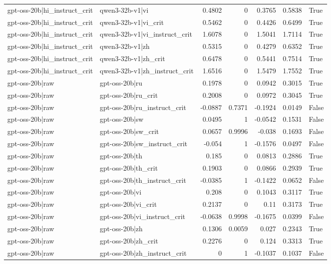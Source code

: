 \begin{table}
\begin{tabular}{l l r r r r l}
gpt-oss-20b|hi_instruct_crit & qwen3-32b-v1|vi & 0.4802 & 0 & 0.3765 & 0.5838 & True \\
gpt-oss-20b|hi_instruct_crit & qwen3-32b-v1|vi_crit & 0.5462 & 0 & 0.4426 & 0.6499 & True \\
gpt-oss-20b|hi_instruct_crit & qwen3-32b-v1|vi_instruct_crit & 1.6078 & 0 & 1.5041 & 1.7114 & True \\
gpt-oss-20b|hi_instruct_crit & qwen3-32b-v1|zh & 0.5315 & 0 & 0.4279 & 0.6352 & True \\
gpt-oss-20b|hi_instruct_crit & qwen3-32b-v1|zh_crit & 0.6478 & 0 & 0.5441 & 0.7514 & True \\
gpt-oss-20b|hi_instruct_crit & qwen3-32b-v1|zh_instruct_crit & 1.6516 & 0 & 1.5479 & 1.7552 & True \\
gpt-oss-20b|raw & gpt-oss-20b|ru & 0.1978 & 0 & 0.0942 & 0.3015 & True \\
gpt-oss-20b|raw & gpt-oss-20b|ru_crit & 0.2008 & 0 & 0.0972 & 0.3045 & True \\
gpt-oss-20b|raw & gpt-oss-20b|ru_instruct_crit & -0.0887 & 0.7371 & -0.1924 & 0.0149 & False \\
gpt-oss-20b|raw & gpt-oss-20b|sw & 0.0495 & 1 & -0.0542 & 0.1531 & False \\
gpt-oss-20b|raw & gpt-oss-20b|sw_crit & 0.0657 & 0.9996 & -0.038 & 0.1693 & False \\
gpt-oss-20b|raw & gpt-oss-20b|sw_instruct_crit & -0.054 & 1 & -0.1576 & 0.0497 & False \\
gpt-oss-20b|raw & gpt-oss-20b|th & 0.185 & 0 & 0.0813 & 0.2886 & True \\
gpt-oss-20b|raw & gpt-oss-20b|th_crit & 0.1903 & 0 & 0.0866 & 0.2939 & True \\
gpt-oss-20b|raw & gpt-oss-20b|th_instruct_crit & -0.0385 & 1 & -0.1422 & 0.0652 & False \\
gpt-oss-20b|raw & gpt-oss-20b|vi & 0.208 & 0 & 0.1043 & 0.3117 & True \\
gpt-oss-20b|raw & gpt-oss-20b|vi_crit & 0.2137 & 0 & 0.11 & 0.3173 & True \\
gpt-oss-20b|raw & gpt-oss-20b|vi_instruct_crit & -0.0638 & 0.9998 & -0.1675 & 0.0399 & False \\
gpt-oss-20b|raw & gpt-oss-20b|zh & 0.1306 & 0.0059 & 0.027 & 0.2343 & True \\
gpt-oss-20b|raw & gpt-oss-20b|zh_crit & 0.2276 & 0 & 0.124 & 0.3313 & True \\
gpt-oss-20b|raw & gpt-oss-20b|zh_instruct_crit & 0 & 1 & -0.1037 & 0.1037 & False \\

\end{tabular}
\end{table}
